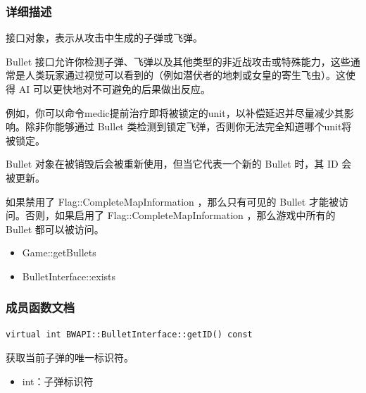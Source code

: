 \subsubsection{详细描述}
接口对象，表示从攻击中生成的子弹或飞弹。\par
Bullet 接口允许你检测子弹、飞弹以及其他类型的非近战攻击或特殊能力，这些通常是人类玩家通过视觉可以看到的（例如潜伏者的地刺或女皇的寄生飞虫）。这使得 AI 可以更快地对不可避免的后果做出反应。\par
例如，你可以命令medic提前治疗即将被锁定的unit，以补偿延迟并尽量减少其影响。除非你能够通过 Bullet 类检测到锁定飞弹，否则你无法完全知道哪个unit将被锁定。\par
Bullet 对象在被销毁后会被重新使用，但当它代表一个新的 Bullet 时，其 ID 会被更新。\par
如果禁用了   Flag::CompleteMapInformation  ，那么只有可见的 Bullet 才能被访问。否则，如果启用了   Flag::CompleteMapInformation  ，那么游戏中所有的 Bullet 都可以被访问。\par
\begin{refer}
    \begin{itemize}
        \item Game::getBullets
        \item BulletInterface::exists
    \end{itemize}
\end{refer}

\subsubsection{成员函数文档}

\begin{tcolorbox}[colback=white, colframe=black!60!white, title=getID(), arc=0mm]
\begin{verbatim}
virtual int BWAPI::BulletInterface::getID() const
\end{verbatim}
获取当前子弹的唯一标识符。
\begin{return}
    \begin{itemize}
            \item int：子弹标识符
    \end{itemize}
\end{return}
\end{tcolorbox}

